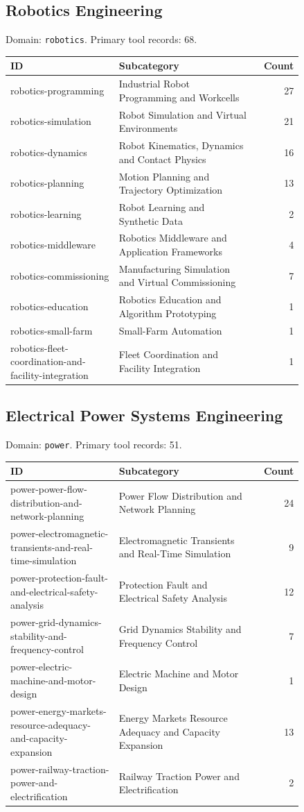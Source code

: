 \subsection{Robotics Engineering}
\noindent Domain: \texttt{robotics}. Primary tool records: 68.
\begin{longtable}{p{0.37\linewidth}p{0.47\linewidth}r}
ID & Subcategory & Count\\\hline\endhead
robotics-programming & Industrial Robot Programming and Workcells & 27\\
robotics-simulation & Robot Simulation and Virtual Environments & 21\\
robotics-dynamics & Robot Kinematics, Dynamics and Contact Physics & 16\\
robotics-planning & Motion Planning and Trajectory Optimization & 13\\
robotics-learning & Robot Learning and Synthetic Data & 2\\
robotics-middleware & Robotics Middleware and Application Frameworks & 4\\
robotics-commissioning & Manufacturing Simulation and Virtual Commissioning & 7\\
robotics-education & Robotics Education and Algorithm Prototyping & 1\\
robotics-small-farm & Small-Farm Automation & 1\\
robotics-fleet-coordination-and-facility-integration & Fleet Coordination and Facility Integration & 1\\
\end{longtable}
\subsection{Electrical Power Systems Engineering}
\noindent Domain: \texttt{power}. Primary tool records: 51.
\begin{longtable}{p{0.37\linewidth}p{0.47\linewidth}r}
ID & Subcategory & Count\\\hline\endhead
power-power-flow-distribution-and-network-planning & Power Flow Distribution and Network Planning & 24\\
power-electromagnetic-transients-and-real-time-simulation & Electromagnetic Transients and Real-Time Simulation & 9\\
power-protection-fault-and-electrical-safety-analysis & Protection Fault and Electrical Safety Analysis & 12\\
power-grid-dynamics-stability-and-frequency-control & Grid Dynamics Stability and Frequency Control & 7\\
power-electric-machine-and-motor-design & Electric Machine and Motor Design & 1\\
power-energy-markets-resource-adequacy-and-capacity-expansion & Energy Markets Resource Adequacy and Capacity Expansion & 13\\
power-railway-traction-power-and-electrification & Railway Traction Power and Electrification & 2\\
\end{longtable}
